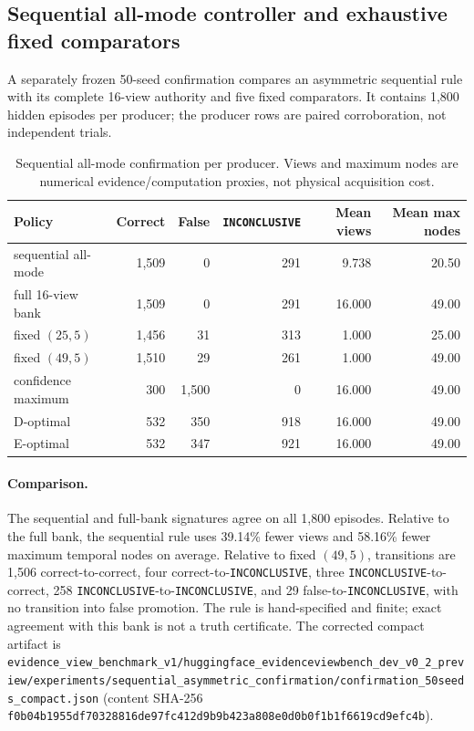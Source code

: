 \documentclass{article}
\newcommand{\INC}{\texttt{INCONCLUSIVE}\xspace}
\begin{document}
\subsection{Sequential all-mode controller and exhaustive fixed comparators}
A separately frozen 50-seed confirmation compares an asymmetric sequential rule with its complete
16-view authority and five fixed comparators. It contains 1,800 hidden episodes per producer; the
producer rows are paired corroboration, not independent trials.
\begin{table}[ht]
\centering\scriptsize
\caption{Sequential all-mode confirmation per producer. Views and maximum nodes are numerical
evidence/computation proxies, not physical acquisition cost.}
\label{tab:sequential-all-mode}
\begin{tabular}{lrrrrr}
\toprule
Policy & Correct & False & \INC & Mean views & Mean max nodes \\
\midrule
sequential all-mode & 1,509 & 0 & 291 & 9.738 & 20.50 \\
full 16-view bank & 1,509 & 0 & 291 & 16.000 & 49.00 \\
fixed $(25,5)$ & 1,456 & 31 & 313 & 1.000 & 25.00 \\
fixed $(49,5)$ & 1,510 & 29 & 261 & 1.000 & 49.00 \\
confidence maximum & 300 & 1,500 & 0 & 16.000 & 49.00 \\
D-optimal & 532 & 350 & 918 & 16.000 & 49.00 \\
E-optimal & 532 & 347 & 921 & 16.000 & 49.00 \\
\bottomrule
\end{tabular}
\end{table}
\paragraph{Comparison.}
The sequential and full-bank signatures agree on all 1,800 episodes. Relative to the full bank,
the sequential rule uses 39.14\% fewer views and 58.16\% fewer maximum temporal nodes on average.
Relative to fixed $(49,5)$, transitions are 1,506 correct-to-correct, four correct-to-\INC, three
\INC-to-correct, 258 \INC-to-\INC, and 29 false-to-\INC, with no transition into false promotion.
The rule is hand-specified and finite; exact agreement with this bank is not a truth certificate.
The corrected compact artifact is
\nolinkurl{evidence_view_benchmark_v1/huggingface_evidenceviewbench_dev_v0_2_preview/experiments/sequential_asymmetric_confirmation/confirmation_50seeds_compact.json}
(content SHA-256
\nolinkurl{f0b04b1955df70328816de97fc412d9b9b423a808e0d0b0f1b1f6619cd9efc4b}).
\end{document}
